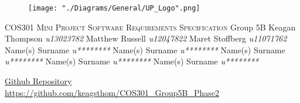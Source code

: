 \begin{titlepage}
\begin{center}
\begin{figure}[t]
\centering
\texttt{[image: "./Diagrams/General/UP\_Logo".png]}
\end{figure}
\begin{flushright}
\textsc{\LARGE COS301 Mini Project \newline\newline Software Requirements \newline   Specification}
\newline\newline \Large Group 5B \newline\newline
\large
Keagan Thompson    \emph{u13023782} \newline
Matthew Russell    \emph{u12047822} \newline
Maret Stoffberg    \emph{u11071762} \newline
Name(s) Surname    \emph{u********} \newline
Name(s) Surname    \emph{u********} \newline
Name(s) Surname    \emph{u********} \newline
Name(s) Surname    \emph{u********} \newline
Name(s) Surname    \emph{u********} \newline
\end{flushright}
\vfill
\href{https://github.com/keagsthom/COS301_Group5B_Phase2}{Github Repository}\\
\url{https://github.com/keagsthom/COS301_Group5B_Phase2}
\end{center}
\end{titlepage}
